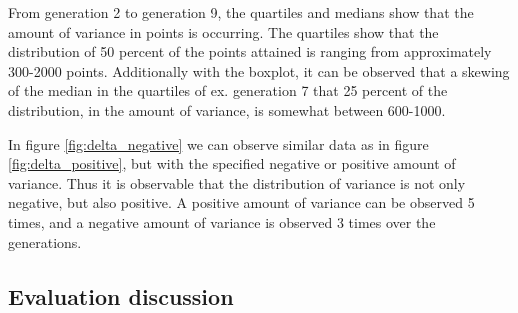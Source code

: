 From generation 2 to generation 9, the quartiles and medians show that the amount of variance in points is occurring. The quartiles show that the distribution of 50  percent of the points attained is ranging from approximately 300-2000 points. Additionally with the boxplot, it can be observed that a skewing of the median in the quartiles of ex. generation 7 that 25 percent of the distribution, in the amount of variance, is somewhat between 600-1000.

In figure \ref{fig:delta_negative} we can observe similar data as in figure \ref{fig:delta_positive}, but with the specified negative or positive amount of variance. Thus it is observable that the distribution of variance is not only negative, but also positive. A positive amount of variance can be observed 5 times, and a negative amount of variance is observed 3 times over the generations.

\newpage
\subsection{Evaluation discussion}